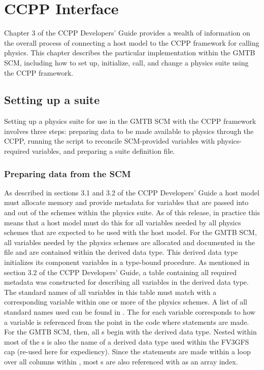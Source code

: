 \chapter{CCPP Interface}
\label{chapter: ccpp_interface}

Chapter 3 of the CCPP Developers' Guide provides a wealth of information on the overall process of connecting a host model to the CCPP framework for calling physics. This chapter describes the particular implementation within the GMTB SCM, including how to set up, initialize, call, and change a physics suite using the CCPP framework.

\section{Setting up a suite}

Setting up a physics suite for use in the GMTB SCM with the CCPP framework involves three steps: preparing data to be made available to physics through the CCPP, running the  script to reconcile SCM-provided variables with physics-required variables, and preparing a suite definition file.

\subsection{Preparing data from the SCM}

As described in sections 3.1 and 3.2 of the CCPP Developers' Guide a host model must allocate memory and provide metadata for variables that are passed into and out of the schemes within the physics suite. As of this release, in practice this means that a host model must do this for all variables needed by all physics schemes that are expected to be used with the host model. For the GMTB SCM, all variables needed by the physics schemes are allocated and documented in the file  and are contained within the  derived data type. This derived data type initializes its component variables in a  type-bound procedure. As mentioned in section 3.2 of the CCPP Developers' Guide, a table containing all required metadata was constructed for describing all variables in the  derived data type. The standard names of all variables in this table must match with a corresponding variable within one or more of the physics schemes. A list of all standard names used can be found in . The  for each variable corresponds to how a variable is referenced from the point in the code where  statements are made. For the GMTB SCM, then, all s begin with the  derived data type. Nested within most of the s is also the name of a derived data type used within the FV3GFS cap (re-used here for expediency). Since the  statements are made within a loop over all columns within , most s are also referenced with  as an array index.

